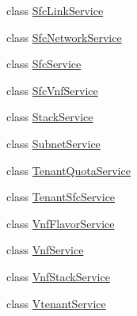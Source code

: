 \begin{DoxyCompactItemize}
\item 
class \mbox{\hyperlink{classcom_1_1example_1_1demo_1_1service_1_1_sfc_link_service}{Sfc\+Link\+Service}}
\item 
class \mbox{\hyperlink{classcom_1_1example_1_1demo_1_1service_1_1_sfc_network_service}{Sfc\+Network\+Service}}
\item 
class \mbox{\hyperlink{classcom_1_1example_1_1demo_1_1service_1_1_sfc_service}{Sfc\+Service}}
\item 
class \mbox{\hyperlink{classcom_1_1example_1_1demo_1_1service_1_1_sfc_vnf_service}{Sfc\+Vnf\+Service}}
\item 
class \mbox{\hyperlink{classcom_1_1example_1_1demo_1_1service_1_1_stack_service}{Stack\+Service}}
\item 
class \mbox{\hyperlink{classcom_1_1example_1_1demo_1_1service_1_1_subnet_service}{Subnet\+Service}}
\item 
class \mbox{\hyperlink{classcom_1_1example_1_1demo_1_1service_1_1_tenant_quota_service}{Tenant\+Quota\+Service}}
\item 
class \mbox{\hyperlink{classcom_1_1example_1_1demo_1_1service_1_1_tenant_sfc_service}{Tenant\+Sfc\+Service}}
\item 
class \mbox{\hyperlink{classcom_1_1example_1_1demo_1_1service_1_1_vnf_flavor_service}{Vnf\+Flavor\+Service}}
\item 
class \mbox{\hyperlink{classcom_1_1example_1_1demo_1_1service_1_1_vnf_service}{Vnf\+Service}}
\item 
class \mbox{\hyperlink{classcom_1_1example_1_1demo_1_1service_1_1_vnf_stack_service}{Vnf\+Stack\+Service}}
\item 
class \mbox{\hyperlink{classcom_1_1example_1_1demo_1_1service_1_1_vtenant_service}{Vtenant\+Service}}
\end{DoxyCompactItemize}
